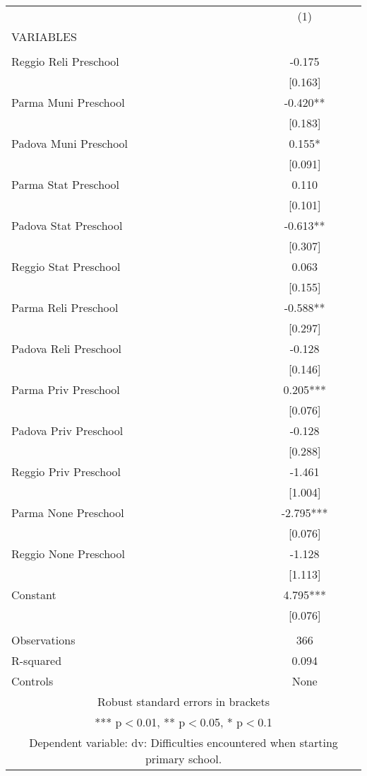 \begin{tabular}{lc} \hline
 & (1) \\
VARIABLES &  \\ \hline
 &  \\
Reggio Reli Preschool & -0.175 \\
 & [0.163] \\
Parma Muni Preschool & -0.420** \\
 & [0.183] \\
Padova Muni Preschool & 0.155* \\
 & [0.091] \\
Parma Stat Preschool & 0.110 \\
 & [0.101] \\
Padova Stat Preschool & -0.613** \\
 & [0.307] \\
Reggio Stat Preschool & 0.063 \\
 & [0.155] \\
Parma Reli Preschool & -0.588** \\
 & [0.297] \\
Padova Reli Preschool & -0.128 \\
 & [0.146] \\
Parma Priv Preschool & 0.205*** \\
 & [0.076] \\
Padova Priv Preschool & -0.128 \\
 & [0.288] \\
Reggio Priv Preschool & -1.461 \\
 & [1.004] \\
Parma None Preschool & -2.795*** \\
 & [0.076] \\
Reggio None Preschool & -1.128 \\
 & [1.113] \\
Constant & 4.795*** \\
 & [0.076] \\
 &  \\
Observations & 366 \\
R-squared & 0.094 \\
 Controls & None \\ \hline
\multicolumn{2}{c}{ Robust standard errors in brackets} \\
\multicolumn{2}{c}{ *** p$<$0.01, ** p$<$0.05, * p$<$0.1} \\
\multicolumn{2}{c}{ Dependent variable: dv: Difficulties encountered when starting primary school.} \\
\end{tabular}
